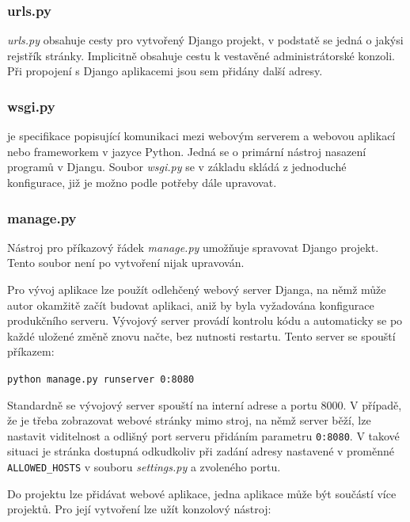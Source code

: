 \subsubsection{urls.py}
\textit{urls.py} obsahuje  cesty pro vytvořený Django projekt, v podstatě se jedná o jakýsi rejstřík stránky. Implicitně obsahuje cestu k vestavěné administrátorské konzoli. Při propojení s Django aplikacemi jsou sem přidány další  adresy.

\subsubsection{wsgi.py}
 je specifikace popisující komunikaci mezi webovým serverem a webovou aplikací nebo frameworkem v jazyce Python. Jedná se o primární nástroj nasazení programů v Djangu. Soubor \textit{wsgi.py} se v základu skládá z jednoduché  konfigurace, již je možno podle potřeby dále upravovat.

\subsubsection{manage.py}
Nástroj pro příkazový řádek \textit{manage.py} umožňuje spravovat Django projekt. Tento soubor není po vytvoření nijak upravován.

Pro vývoj aplikace lze použít odlehčený webový server Djanga, na němž může autor okamžitě začít budovat aplikaci, aniž by byla vyžadována konfigurace produkčního serveru. Vývojový server provádí kontrolu kódu a automaticky se po každé uložené změně znovu načte, bez nutnosti restartu. Tento server se spouští příkazem:

\begin{center}
\texttt{python manage.py runserver 0:8080}
\end{center}

Standardně se vývojový server spouští na interní  adrese a portu 8000. V případě, že je třeba zobrazovat webové stránky mimo stroj, na němž server běží, lze nastavit viditelnost a odlišný port serveru přidáním parametru \texttt{0:8080}. V takové situaci je stránka dostupná odkudkoliv při zadání adresy nastavené v proměnné \texttt{ALLOWED\_HOSTS} v souboru \textit{settings.py} a zvoleného portu.

Do projektu lze přidávat webové aplikace, jedna aplikace může být součástí více projektů. Pro její vytvoření lze užít konzolový nástroj:

